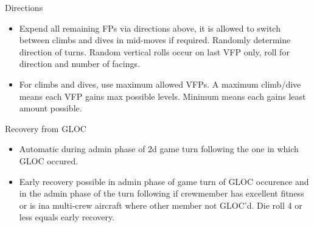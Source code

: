 \begin{table}
\medskip
\begin{minipage}{\linewidth}
\begin{center}
Directions
\end{center}
\begin{itemize}
    \item Expend all remaining FPs via directions above, it is allowed to switch between climbs and dives in mid-moves if required. Randomly determine direction of turns. Random vertical rolls occur on last VFP only, roll for direction and number of facings.
    \item For climbs and dives, use maximum allowed VFPs. A maximum climb/dive means each VFP gains max possible levels. Minimum means each gains least amount possible.
\end{itemize}
\end{minipage}
\end{table}

\begin{table}

\caption{Recovery from GLOC}

\medskip
\begin{minipage}{\linewidth}\begin{itemize}
    \item Automatic during admin phase of 2d game turn following the one in which GLOC occured.
    \item Early recovery possible in admin phase of game turn of GLOC occurence and in the admin phase of the turn following if crewmember has excellent fitness or is ina multi-crew aircraft where other member not GLOC'd. Die roll 4 or less equals early recovery.
\end{itemize}
\end{minipage}

\end{table}
